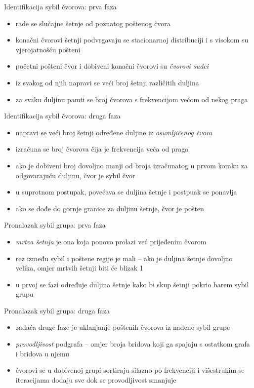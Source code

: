 \documentclass{beamer}
\begin{document}
\begin{frame}{Identifikacija sybil čvorova: prva faza}
  \begin{itemize}
    \item rade se slučajne šetnje od poznatog poštenog čvora
    \item konačni čvorovi šetnji podvrgavaju se stacionarnoj distribuciji i s visokom su vjerojatnošću pošteni
    \item početni pošteni čvor i dobiveni konačni čvorovi su \textit{čvorovi sudci}
    \item iz svakog od njih napravi se veći broj šetnji različitih duljina
    \item za svaku duljinu pamti se broj čvorova s frekvencijom većom od nekog praga
  \end{itemize}
\end{frame}

\begin{frame}{Identifikacija sybil čvorova: druga faza}
  \begin{itemize}
    \item napravi se veći broj šetnji određene duljine iz \textit{osumljičenog čvora}
    \item izračuna se broj čvorova čija je frekvencija veća od praga
    \item ako je dobiveni broj dovoljno manji od broja izračunatog u prvom koraku za odgovarajuću duljinu, čvor je sybil čvor
    \item u suprotnom postupak, povećava se duljina šetnje i postpuak se ponavlja
    \item ako se dođe do gornje granice za duljinu šetnje, čvor je pošten
  \end{itemize}
\end{frame}

\begin{frame}{Pronalazak sybil grupa: prva faza}
  \begin{itemize}
    \item \textit{mrtva šetnja} je ona koja ponovo prolazi već prijeđenim čvorom
    \item rez između sybil i poštene regije je mali -- ako je duljina šetnje dovoljno velika, omjer mrtvih šetnji biti će blizak 1
    \item u prvoj se fazi određuje duljina šetnje kako bi skup šetnji pokrio barem sybil grupu
  \end{itemize}
\end{frame}

\begin{frame}{Pronalazak sybil grupa: druga faza}
  \begin{itemize}
    \item zadaća druge faze je uklanjanje poštenih čvorova iz nađene sybil grupe
    \item \textit{provodljivost} podgrafa -- omjer broja bridova koji ga spajaju s ostatkom grafa i bridova u njemu
    \item čvorovi se u dobivenoj grupi sortiraju silazno po frekvenciji i višestrukim se iteracijama dodaju sve dok se provodljivost smanjuje
  \end{itemize}
\end{frame}
\end{document}
